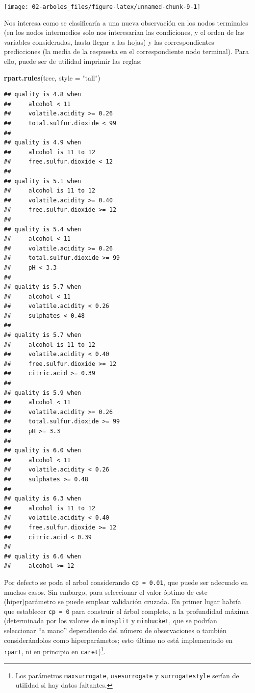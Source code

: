 \documentclass[
  spanish,
]{book}
\newenvironment{Shaded}{\begin{snugshade}}{\end{snugshade}}
\newcommand{\DataTypeTok}[1]{\textcolor[rgb]{0.13,0.29,0.53}{#1}}
\newcommand{\KeywordTok}[1]{\textcolor[rgb]{0.13,0.29,0.53}{\textbf{#1}}}
\newcommand{\NormalTok}[1]{#1}
\newcommand{\StringTok}[1]{\textcolor[rgb]{0.31,0.60,0.02}{#1}}
\theoremstyle{break}
\theoremstyle{definition}
\theoremstyle{definition}
\theoremstyle{definition}
\theoremstyle{remark}
\begin{document}
\begin{center}\texttt{[image: 02-arboles\_files/figure-latex/unnamed-chunk-9-1]} \end{center}

Nos interesa como se clasificaría a una nueva observación en los nodos terminales (en los nodos intermedios solo nos interesarían las condiciones, y el orden de las variables consideradas, hasta llegar a las hojas) y las correspondientes predicciones (la media de la respuesta en el correspondiente nodo terminal).
Para ello, puede ser de utilidad imprimir las reglas:

\begin{Shaded}
\begin{Highlighting}[]
\KeywordTok{rpart.rules}\NormalTok{(tree, }\DataTypeTok{style =} \StringTok{"tall"}\NormalTok{)}
\end{Highlighting}
\end{Shaded}

\begin{verbatim}
## quality is 4.8 when
##     alcohol < 11
##     volatile.acidity >= 0.26
##     total.sulfur.dioxide < 99
## 
## quality is 4.9 when
##     alcohol is 11 to 12
##     free.sulfur.dioxide < 12
## 
## quality is 5.1 when
##     alcohol is 11 to 12
##     volatile.acidity >= 0.40
##     free.sulfur.dioxide >= 12
## 
## quality is 5.4 when
##     alcohol < 11
##     volatile.acidity >= 0.26
##     total.sulfur.dioxide >= 99
##     pH < 3.3
## 
## quality is 5.7 when
##     alcohol < 11
##     volatile.acidity < 0.26
##     sulphates < 0.48
## 
## quality is 5.7 when
##     alcohol is 11 to 12
##     volatile.acidity < 0.40
##     free.sulfur.dioxide >= 12
##     citric.acid >= 0.39
## 
## quality is 5.9 when
##     alcohol < 11
##     volatile.acidity >= 0.26
##     total.sulfur.dioxide >= 99
##     pH >= 3.3
## 
## quality is 6.0 when
##     alcohol < 11
##     volatile.acidity < 0.26
##     sulphates >= 0.48
## 
## quality is 6.3 when
##     alcohol is 11 to 12
##     volatile.acidity < 0.40
##     free.sulfur.dioxide >= 12
##     citric.acid < 0.39
## 
## quality is 6.6 when
##     alcohol >= 12
\end{verbatim}

Por defecto se poda el arbol considerando \texttt{cp\ =\ 0.01}, que puede ser adecuado en muchos casos.
Sin embargo, para seleccionar el valor óptimo de este (hiper)parámetro se puede emplear validación cruzada.
En primer lugar habría que establecer \texttt{cp\ =\ 0} para construir el árbol completo, a la profundidad máxima
(determinada por los valores de \texttt{minsplit} y \texttt{minbucket}, que se podrían seleccionar
``a mano'' dependiendo del número de observaciones o también considerándolos como hiperparámetos; esto último no está implementado en \texttt{rpart}, ni en principio en \texttt{caret})\footnote{Los parámetros \texttt{maxsurrogate}, \texttt{usesurrogate} y \texttt{surrogatestyle} serían de utilidad si hay datos faltantes.}.
\end{document}
